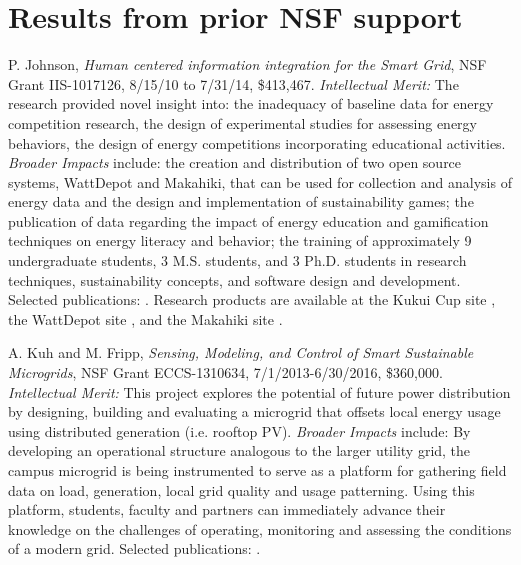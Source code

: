 
\section{Results from prior NSF support}

P. Johnson, {\em Human centered information integration for the Smart Grid}, NSF Grant IIS-1017126, 8/15/10 to 7/31/14, \$413,467. 
{\em Intellectual Merit:} The research provided novel insight into: the inadequacy of baseline data for energy competition research, the design of experimental studies for assessing energy behaviors, the design of energy competitions incorporating educational activities. 
{\em Broader Impacts} include: the creation and distribution of two open source systems, WattDepot and Makahiki, that can be used for collection and analysis of energy data and the design and implementation of sustainability games; the publication of data regarding the impact of energy
education and gamification techniques on energy literacy and behavior; the training of approximately 9 undergraduate students, 3 M.S. students, and 3 Ph.D. students in research techniques, sustainability concepts, and software design and development.
Selected publications:
  \cite{csdl2-10-05,csdl2-10-07,csdl2-10-08,csdl2-11-02,csdl2-11-03,csdl2-12-06,csdl2-11-07, csdl2-12-12,csdl2-13-10,csdl2-13-05,csdl2-13-03}. Research products are available at the Kukui Cup site \cite{kukuicup}, the WattDepot site \cite{wattdepot}, and the Makahiki site \cite{makahiki}.

A. Kuh and M. Fripp, {\em Sensing, Modeling, and Control of Smart Sustainable Microgrids}, NSF Grant ECCS-1310634, 7/1/2013-6/30/2016, \$360,000. 
{\em Intellectual Merit:} This project explores the potential of future power distribution by designing, building and evaluating a microgrid that offsets local energy usage using distributed generation (i.e. rooftop PV).
{\em Broader Impacts} include: By developing an operational structure analogous to the larger utility grid, the campus microgrid is being instrumented to serve as a platform for gathering field data on load, generation, local grid quality and usage patterning. Using this platform, students, faculty and partners can immediately advance their knowledge on the challenges of operating, monitoring and assessing the conditions of a modern grid. Selected publications: \cite{Fatemi2014}.

